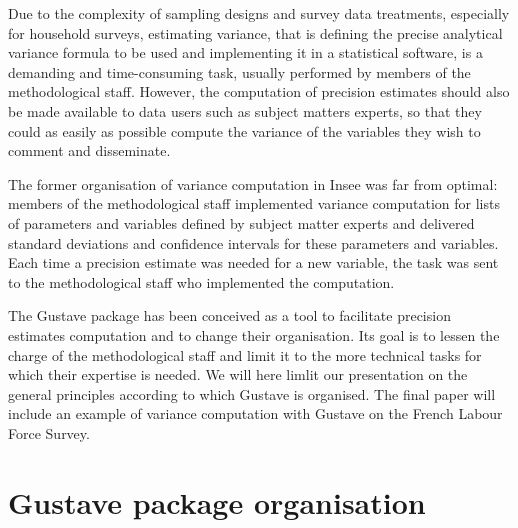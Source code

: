 \documentclass[12pt,a4paper]{article}
\begin{document}
\par Due to the complexity of sampling designs and survey data treatments, especially for household surveys, estimating variance, that is defining the precise analytical variance formula to be used and implementing it in a statistical software, is a demanding and time-consuming task, usually performed by members of the methodological staff. However, the computation of precision estimates should also be made available to data users such as subject matters experts, so that they could as easily as possible compute the variance of the variables they wish to comment and disseminate.\\ 

\par The former organisation of variance computation in Insee was far from optimal: members of the methodological staff implemented variance computation for lists of parameters and variables defined by subject matter experts and delivered standard deviations and confidence intervals for these parameters and variables. Each time a precision estimate was needed for a new variable, the task was sent to the methodological staff who implemented the computation.\\

\par The Gustave package has been conceived as a tool to facilitate precision estimates computation and to change their organisation. Its goal is to lessen the charge of the methodological staff and limit it to the more technical tasks for which their expertise is needed. We will here limlit our presentation on the general principles according to which Gustave is organised. The final paper will include an example of variance computation with Gustave on the French Labour Force Survey.



\section{Gustave package organisation}
\end{document}
